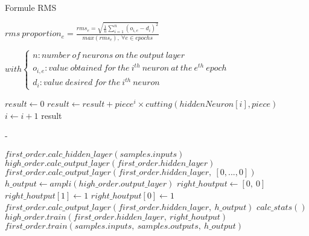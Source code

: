 \documentclass[a4paper]{article}
\begin{document}
Formule RMS

$ rms\ proportion_{e} = \frac{ rms_{e} = \sqrt{ \frac{1}{n} \sum \limits_{i=1}^{n} ( o_{i,e} - d_{i} )^2 }}{max(rms_{e}),\ \forall e \in epochs } $

$ with \left\lbrace \begin{array}{lll} n : number\ of\ neurons\ on\ the\ output\ layer\\o_{i,e} : value\ obtained\ for\ the\ i^{th}\ neuron\ at\ the\ e^{th}\ epoch\\d_{i} : value\ desired \ for\ the\ i^{th}\ neuron\end{array} \right.$
         


\newpage


\begin{algorithmic}

\State $result \gets 0$
\State $result \gets result + piece^{i} \times cutting(hiddenNeuron[i], piece) $
\State $i \gets i + 1$
\EndFor
\State \Return result
\EndFunction

\end{algorithmic}

 -\\[4cm]

\begin{algorithmic}

\State $first\_order.calc\_hidden\_layer(samples.inputs)$
\State $high\_order.calc\_output\_layer(first\_order.hidden\_layer)$
\State $first\_order.calc\_output\_layer(first\_order.hidden\_layer,\ [0, ..., 0])$
\State 
\State $h\_output \gets ampli(high\_order.output\_layer)$
\State $right\_houtput \gets [0,\ 0]$
  \State $right\_houtput[1] \gets 1$
\Else
  \State $right\_houtput[0] \gets 1$
\EndIf
\State $first\_order.calc\_output\_layer(first\_order.hidden\_layer,\ h\_output)$
\State
\State $calc\_stats()$
\State
\State $high\_order.train(first\_order.hidden\_layer,\ right\_houtput)$
\State $first\_order.train(samples.inputs,\ samples.outputs,\ h\_output)$


\end{algorithmic}


\newpage
\end{document}

